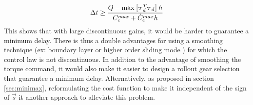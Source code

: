 %
\begin{align}
\Delta t \geq \frac{Q - \operatornamewithlimits{max}\left[\vec{\tau}_d^T \vec{\tau}_d\right] h }{ C_{c}^{max}  +   \dot{C}_{c}^{max} h }
\end{align}
%
This shows that with large discontinuous gains, it would be harder to guarantee a minimum delay. There is thus a double advantages for using a smoothing technique (ex: boundary layer \cite{slotine_applied_1991} or higher order sliding mode \cite{perruquetti_sliding_2002}) for which the control law is not discontinuous. In addition to the advantage of smoothing the torque command, it would also make it easier to design a rollout gear selection that guarantee a minimum delay. Alternatively, as proposed in section \ref{sec:minimax}, reformulating the cost function to make it independent of the sign of $\vec{s}$ it another approach to alleviate this problem.  

